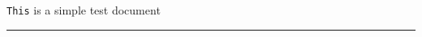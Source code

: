 \documentclass[12pt]{article}
\begin{document}
{\Large\tt This} is a simple test document\rule{1pt}{1pt}
\end{document}
